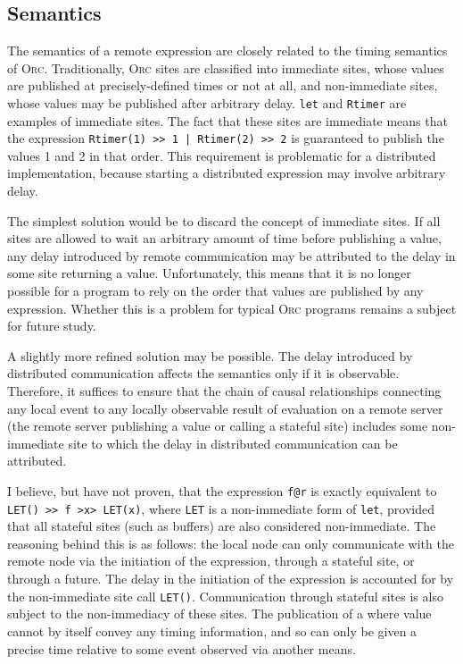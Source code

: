 \documentclass[10pt,letterpaper]{article}
\begin{document}
\subsection{Semantics}

The semantics of a remote expression are closely related to the timing
semantics of \textsc{Orc}. Traditionally, \textsc{Orc} sites are classified
into immediate sites, whose values are published at precisely-defined times or
not at all, and non-immediate sites, whose values may be published after
arbitrary delay. \texttt{let} and \texttt{Rtimer} are examples of immediate
sites. The fact that these sites are immediate means that the expression
\texttt{Rtimer(1) >> 1 | Rtimer(2) >> 2} is guaranteed to publish the values 1
and 2 in that order.  This requirement is problematic for a distributed
implementation, because starting a distributed expression may involve arbitrary
delay.

The simplest solution would be to discard the concept of immediate sites. If
all sites are allowed to wait an arbitrary amount of time before publishing a
value, any delay introduced by remote communication may be attributed to the
delay in some site returning a value.  Unfortunately, this means that it is no
longer possible for a program to rely on the order that values are published by
any expression.  Whether this is a problem for typical \textsc{Orc} programs
remains a subject for future study.

A slightly more refined solution may be possible.  The delay introduced by
distributed communication affects the semantics only if it is observable.
Therefore, it suffices to ensure that the chain of causal relationships
connecting any local event to any locally observable result of evaluation on a
remote server (the remote server publishing a value or calling a stateful site)
includes some non-immediate site to which the delay in distributed
communication can be attributed.

I believe, but have not proven, that the expression \texttt{f@r} is exactly
equivalent to \texttt{LET() >> f >x> LET(x)}, where \texttt{LET} is a
non-immediate form of \texttt{let}, provided that all stateful sites (such as
buffers) are also considered non-immediate.  The reasoning behind this is as
follows: the local node can only communicate with the remote node via the
initiation of the expression, through a stateful site, or through a future. The
delay in the initiation of the expression is accounted for by the non-immediate
site call \texttt{LET()}. Communication through stateful sites is also subject
to the non-immediacy of these sites. The publication of a where value cannot by
itself convey any timing information, and so can only be given a precise time
relative to some event observed via another means.
\end{document}

